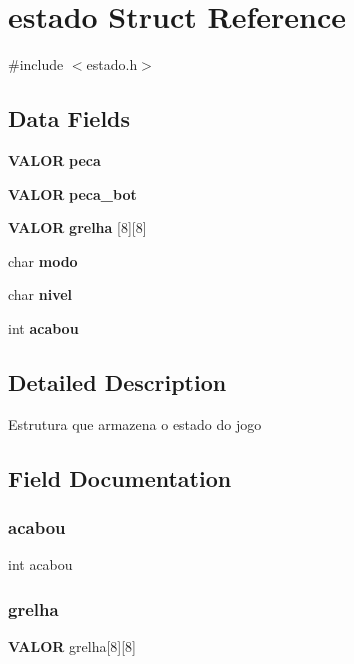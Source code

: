 \section{estado Struct Reference}
\label{structestado}


{\ttfamily \#include $<$estado.\+h$>$}

\subsection*{Data Fields}
\begin{DoxyCompactItemize}
\item 
\textbf{ V\+A\+L\+OR} \textbf{ peca}
\item 
\textbf{ V\+A\+L\+OR} \textbf{ peca\+\_\+bot}
\item 
\textbf{ V\+A\+L\+OR} \textbf{ grelha} [8][8]
\item 
char \textbf{ modo}
\item 
char \textbf{ nivel}
\item 
int \textbf{ acabou}
\end{DoxyCompactItemize}


\subsection{Detailed Description}
Estrutura que armazena o estado do jogo 

\subsection{Field Documentation}
\mbox{\label{structestado_a61d92dcf7c59365852da8ee7c4830e0a}} 
\subsubsection{acabou}
{\footnotesize\ttfamily int acabou}

\mbox{\label{structestado_a15b404b48236843b08e0016bba69fec8}} 
\subsubsection{grelha}
{\footnotesize\ttfamily \textbf{ V\+A\+L\+OR} grelha[8][8]}

\mbox{\label{structestado_a8bdf62f83bb8988045d5016da2b43779}} 
